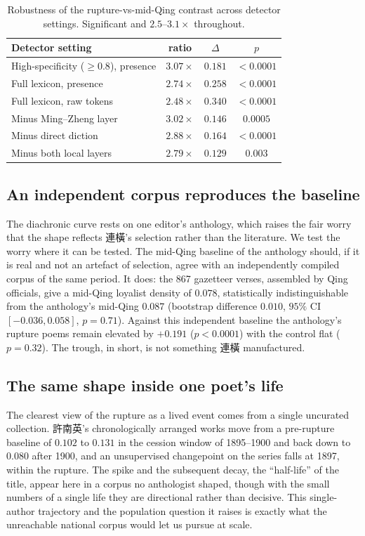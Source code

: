 \documentclass[10pt,twocolumn]{article}
\begin{document}
\begin{table}[t]
\centering
\footnotesize
\caption{Robustness of the rupture-vs-mid-Qing contrast across detector settings. Significant
and $2.5$--$3.1\times$ throughout.}
\label{tab:robust}
\begin{tabular}{lccc}
\toprule
Detector setting & ratio & $\Delta$ & $p$ \\
\midrule
High-specificity ($\geq 0.8$), presence & $3.07\times$ & $0.181$ & $<0.0001$ \\
Full lexicon, presence                  & $2.74\times$ & $0.258$ & $<0.0001$ \\
Full lexicon, raw tokens                & $2.48\times$ & $0.340$ & $<0.0001$ \\
Minus Ming--Zheng layer                 & $3.02\times$ & $0.146$ & $0.0005$ \\
Minus direct diction                    & $2.88\times$ & $0.164$ & $<0.0001$ \\
Minus both local layers                 & $2.79\times$ & $0.129$ & $0.003$ \\
\bottomrule
\end{tabular}
\end{table}

\subsection{An independent corpus reproduces the baseline}
The diachronic curve rests on one editor's anthology, which raises the fair worry that the
shape reflects \mbox{連橫}'s selection rather than the literature. We test the worry where it
can be tested. The mid-Qing baseline of the anthology should, if it is real and not an
artefact of selection, agree with an independently compiled corpus of the same period. It
does: the 867 gazetteer verses, assembled by Qing officials, give a mid-Qing loyalist density
of $0.078$, statistically indistinguishable from the anthology's mid-Qing $0.087$ (bootstrap
difference $0.010$, $95\%$ CI $[-0.036, 0.058]$, $p=0.71$). Against this independent baseline
the anthology's rupture poems remain elevated by $+0.191$ ($p<0.0001$) with the control flat
($p=0.32$). The trough, in short, is not something \mbox{連橫} manufactured.

\subsection{The same shape inside one poet's life}
The clearest view of the rupture as a lived event comes from a single uncurated collection.
\mbox{許南英}'s chronologically arranged works move from a pre-rupture baseline of $0.102$ to
$0.131$ in the cession window of 1895--1900 and back down to $0.080$ after 1900, and an
unsupervised changepoint on the series falls at 1897, within the rupture. The spike and the
subsequent decay, the ``half-life'' of the title, appear here in a corpus no anthologist
shaped, though with the small numbers of a single life they are directional rather than
decisive. This single-author trajectory and the population question it raises is exactly what
the unreachable national corpus would let us pursue at scale.
\end{document}
